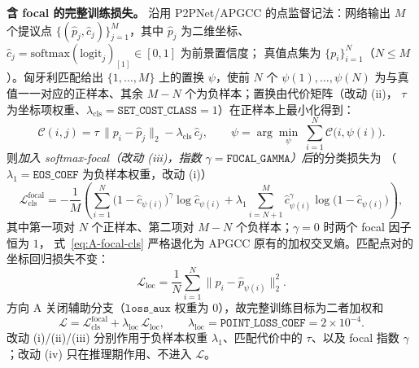 \textbf{含 focal 的完整训练损失。}
沿用 P2PNet/APGCC 的点监督记法：网络输出 $M$ 个提议点 $\{(\hat{p}_j,\hat{c}_j)\}_{j=1}^{M}$，其中
$\hat{p}_j$ 为二维坐标、$\hat{c}_j\!=\!\mathrm{softmax}(\text{logit}_j)_{[1]}\!\in\![0,1]$ 为前景置信度；
真值点集为 $\{p_i\}_{i=1}^{N}$（$N\!\le\!M$）。匈牙利匹配给出 $\{1,\dots,M\}$ 上的置换 $\psi$，使前 $N$ 个
$\psi(1),\dots,\psi(N)$ 为与真值一一对应的正样本、其余 $M{-}N$ 个为负样本；置换由代价矩阵（改动 (ii)，
$\tau$ 为坐标项权重、$\lambda_{\text{cls}}{=}\texttt{SET\_COST\_CLASS}{=}1$）在正样本上最小化得到：
\begin{equation}
    \mathcal{C}(i,j)=\tau\,\lVert p_i-\hat{p}_j\rVert_2-\lambda_{\text{cls}}\,\hat{c}_j,\qquad
    \psi=\arg\min_{\psi}\;\textstyle\sum_{i=1}^{N}\mathcal{C}\big(i,\psi(i)\big).
\end{equation}
则\emph{加入 softmax-focal（改动 (iii)，指数 $\gamma\!=\!\texttt{FOCAL\_GAMMA}$）后}的分类损失为
（$\lambda_1\!=\!\texttt{EOS\_COEF}$ 为负样本权重，改动 (i)）
\begin{equation}
    \mathcal{L}_{\text{cls}}^{\text{focal}}
    =-\frac{1}{M}\left(
        \sum_{i=1}^{N}\big(1-\hat{c}_{\psi(i)}\big)^{\gamma}\log \hat{c}_{\psi(i)}
        +\lambda_1\sum_{i=N+1}^{M}\hat{c}_{\psi(i)}^{\gamma}\log\big(1-\hat{c}_{\psi(i)}\big)
    \right),
    \label{eq:A-focal-cls}
\end{equation}
其中第一项对 $N$ 个正样本、第二项对 $M{-}N$ 个负样本；$\gamma{=}0$ 时两个 focal 因子恒为 $1$，
式~\eqref{eq:A-focal-cls} 严格退化为 APGCC 原有的加权交叉熵。匹配点对的坐标回归损失不变：
\begin{equation}
    \mathcal{L}_{\text{loc}}=\frac{1}{N}\sum_{i=1}^{N}\big\lVert p_i-\hat{p}_{\psi(i)}\big\rVert_2^2 .
\end{equation}
方向 A 关闭辅助分支（$\texttt{loss\_aux}$ 权重为 $0$），故完整训练目标为二者加权和
\begin{equation}
    \mathcal{L}=\mathcal{L}_{\text{cls}}^{\text{focal}}+\lambda_{\text{loc}}\,\mathcal{L}_{\text{loc}},
    \qquad \lambda_{\text{loc}}=\texttt{POINT\_LOSS\_COEF}=2\times10^{-4}.
\end{equation}
改动 (i)/(ii)/(iii) 分别作用于负样本权重 $\lambda_1$、匹配代价中的 $\tau$、以及 focal 指数 $\gamma$；改动 (iv) 只在推理期作用、不进入 $\mathcal{L}$。

